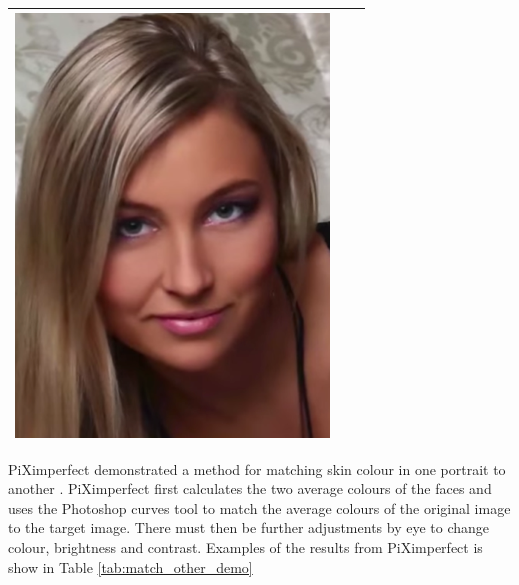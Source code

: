 \begin{longtable}{|c|c|c|}
\begin{minipage}{.29\textwidth}
    \includegraphics[width=\textwidth,height=\textheight,keepaspectratio]{images/match_body_res}
  \end{minipage} \\
    \hline
\end{longtable}

PiXimperfect demonstrated a method for matching skin colour in one portrait to another \cite{photoshop:match_other}. PiXimperfect first calculates the two average colours of the faces and uses the Photoshop curves tool to match the average colours of the original image to the target image. There must then be further adjustments by eye to change colour, brightness and contrast. Examples of the results from PiXimperfect is show in Table \ref{tab:match_other_demo}


